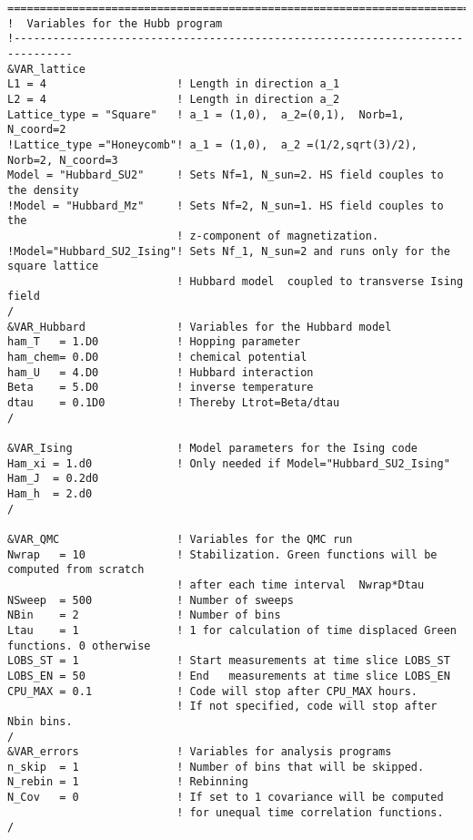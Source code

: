\begin{lstlisting} 
===============================================================================
!  Variables for the Hubb program
!-------------------------------------------------------------------------------
&VAR_lattice
L1 = 4                    ! Length in direction a_1
L2 = 4                    ! Length in direction a_2
Lattice_type = "Square"	  ! a_1 = (1,0),  a_2=(0,1),  Norb=1, N_coord=2
!Lattice_type ="Honeycomb"! a_1 = (1,0),  a_2 =(1/2,sqrt(3)/2), Norb=2, N_coord=3
Model = "Hubbard_SU2"     ! Sets Nf=1, N_sun=2. HS field couples to the density
!Model = "Hubbard_Mz"     ! Sets Nf=2, N_sun=1. HS field couples to the 
                          ! z-component of magnetization.  
!Model="Hubbard_SU2_Ising"! Sets Nf_1, N_sun=2 and runs only for the square lattice
                          ! Hubbard model  coupled to transverse Ising field
/
&VAR_Hubbard              ! Variables for the Hubbard model
ham_T   = 1.D0            ! Hopping parameter
ham_chem= 0.D0            ! chemical potential
ham_U   = 4.D0            ! Hubbard interaction
Beta    = 5.D0            ! inverse temperature
dtau    = 0.1D0           ! Thereby Ltrot=Beta/dtau
/

&VAR_Ising                ! Model parameters for the Ising code
Ham_xi = 1.d0             ! Only needed if Model="Hubbard_SU2_Ising"
Ham_J  = 0.2d0
Ham_h  = 2.d0
/

&VAR_QMC                  ! Variables for the QMC run
Nwrap   = 10              ! Stabilization. Green functions will be computed from scratch 
                          ! after each time interval  Nwrap*Dtau
NSweep  = 500             ! Number of sweeps
NBin    = 2               ! Number of bins
Ltau    = 1               ! 1 for calculation of time displaced Green functions. 0 otherwise
LOBS_ST = 1               ! Start measurements at time slice LOBS_ST
LOBS_EN = 50              ! End   measurements at time slice LOBS_EN
CPU_MAX = 0.1             ! Code will stop after CPU_MAX hours. 
                          ! If not specified, code will stop after Nbin bins.
/                          
&VAR_errors               ! Variables for analysis programs
n_skip  = 1               ! Number of bins that will be skipped. 
N_rebin = 1               ! Rebinning  
N_Cov   = 0               ! If set to 1 covariance will be computed
                          ! for unequal time correlation functions.                   
/            
\end{lstlisting}
%

